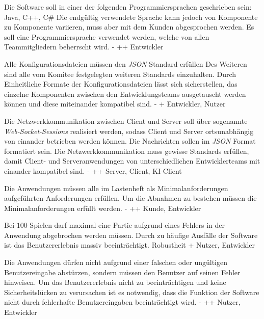         {Die Software soll in einer der folgenden Programmiersprachen geschrieben sein: Java, C++, C\# Die endgültig verwendete Sprache kann jedoch von Komponente zu Komponente variieren, muss aber mit dem Kunden abgesprochen werden.}
        {Es soll eine Programmiersprache verwendet werden, welche von allen Teammitgliedern beherrscht wird.}
        {-}
        {++}
        {Entwickler}	

        {Alle Konfigurationsdateien müssen den \textit{JSON} Standard erfüllen Des Weiteren sind alle vom Komitee festgelegten weiteren Standards einzuhalten.}
        {Durch Einheitliche Formate der Konfigurationsdateien lässt sich sicherstellen, das einzelne Komponenten zwischen den Entwicklungsteams ausgetauscht werden können und diese miteinander kompatibel sind. }
        {-}
        {+}
        {Entwickler, Nutzer}

        {Die Netzwerkkommunikation zwischen Client und Server soll über sogenannte \textit{Web-Socket-Sessions} realisiert werden, sodass Client und Server ortsunabhängig von einander betrieben werden können. Die Nachrichten sollen im \textit{JSON} Format formatiert sein.}
        {Die Netzwerkkommunikation muss gewisse Standards erfüllen, damit Client- und Serveranwendungen von unterschiedlichen Entwicklerteams mit einander kompatibel sind.}
        {-}
        {++}
        {Server, Client, KI-Client}

        {Die Anwendungen müssen alle im Lastenheft als Minimalanforderungen aufgeführten Anforderungen erfüllen.}
        {Um die Abnahmen zu bestehen müssen die Minimalanforderungen erfüllt werden.}
        {-}
        {++}
        {Kunde, Entwickler}

        {Bei $100$ Spielen darf maximal eine Partie aufgrund eines Fehlers in der Anwendung abgebrochen werden müssen.}
        {Durch zu häufige Ausfälle der Software ist das Benutzererlebnis massiv beeinträchtigt.}
        {Robustheit}
        {+}
        {Nutzer, Entwickler}

        {Die Anwendungen dürfen nicht aufgrund einer falschen oder ungültigen Benutzereingabe abstürzen, sondern müssen den Benutzer auf seinen Fehler hinweisen.}
        {Um das Benutzererlebnis nicht zu beeinträchtigen und keine Sicherheitslücken zu verursachen ist es notwendig, dass die Funktion der Software nicht durch fehlerhafte Benutzereingaben beeinträchtigt wird.}
        {-}
        {++}
        {Nutzer, Entwickler}

